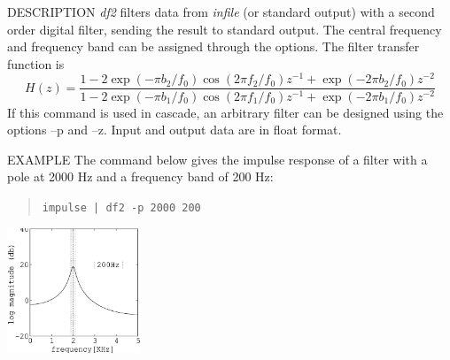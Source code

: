 \begin{synopsis}
 \item[df2] [ --f $f_0$ ] [ --p $f_1 \; b_1$ ] [ --z $f_2 \; b_2$ ] 
	    [ {\em infile} ]
\end{synopsis}

\begin{qsection}{DESCRIPTION}
{\em df2} filters data from {\em infile} (or standard output) 
with a second order digital filter, 
sending the result to standard output.
The central frequency and frequency band can
  be assigned through the options.
  The filter transfer function is
  \begin{displaymath}
   H(z)=\frac{1-2\exp(-\pi b_2/f_0)\cos(2\pi f_2/f_0)z^{-1} +
	\exp(-2\pi b_2/f_0)z^{-2}}
   {1-2\exp(-\pi b_1/f_0)\cos(2\pi f_1/f_0)z^{-1}+\exp(-2\pi b_1/f_0)z^{-2}}
  \end{displaymath}
 If this command is used in cascade, an arbitrary filter can be
 designed using the options --p and --z.
 Input and output data are in float format.
\end{qsection}

\begin{options}
\end{options} 

\begin{qsection}{EXAMPLE}
The command below gives the impulse response of a filter with
a pole at 2000 Hz and a frequency band of 200 Hz:
\begin{quote}
 \verb!impulse | df2 -p 2000 200 !
\end{quote}
\hspace{3cm}
\includegraphics[width=4cm]{fig/df2.eps}
\end{qsection}
